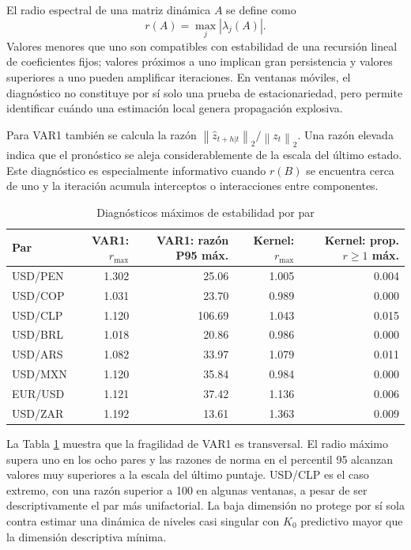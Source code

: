 \documentclass[a4paper,11pt]{article}
\newcommand{\norm}[1]{\left\lVert #1 \right\rVert}
\begin{document}
El radio espectral de una matriz dinámica \(A\) se define como
\[
  r(A)=\max_j|\lambda_j(A)|.
\]
Valores menores que uno son compatibles con estabilidad de una recursión lineal de coeficientes fijos; valores próximos a uno implican gran persistencia y valores superiores a uno pueden amplificar iteraciones. En ventanas móviles, el diagnóstico no constituye por sí solo una prueba de estacionariedad, pero permite identificar cuándo una estimación local genera propagación explosiva.

Para VAR1 también se calcula la razón \(\norm{\widehat z_{t+h|t}}_2/\norm{z_t}_2\). Una razón elevada indica que el pronóstico se aleja considerablemente de la escala del último estado. Este diagnóstico es especialmente informativo cuando \(r(B)\) se encuentra cerca de uno y la iteración acumula interceptos o interacciones entre componentes.

\begin{table}[H]
\centering
\caption{Diagnósticos máximos de estabilidad por par}
\label{tab:stability_pairs}
\scriptsize
\begin{tabular}{lrrrr}
\toprule
Par & VAR1: \(r_{\max}\) & VAR1: razón P95 máx. & Kernel: \(r_{\max}\) & Kernel: prop. \(r\geq1\) máx. \\
\midrule
USD/PEN & 1.302 & 25.06 & 1.005 & 0.004 \\
USD/COP & 1.031 & 23.70 & 0.989 & 0.000 \\
USD/CLP & 1.120 & 106.69 & 1.043 & 0.015 \\
USD/BRL & 1.018 & 20.86 & 0.986 & 0.000 \\
USD/ARS & 1.082 & 33.97 & 1.079 & 0.011 \\
USD/MXN & 1.120 & 35.84 & 0.984 & 0.000 \\
EUR/USD & 1.121 & 37.42 & 1.136 & 0.006 \\
USD/ZAR & 1.192 & 13.61 & 1.363 & 0.009 \\
\bottomrule
\end{tabular}
\end{table}

La Tabla \ref{tab:stability_pairs} muestra que la fragilidad de VAR1 es transversal. El radio máximo supera uno en los ocho pares y las razones de norma en el percentil 95 alcanzan valores muy superiores a la escala del último puntaje. USD/CLP es el caso extremo, con una razón superior a 100 en algunas ventanas, a pesar de ser descriptivamente el par más unifactorial. La baja dimensión no protege por sí sola contra estimar una dinámica de niveles casi singular con \(K_0\) predictivo mayor que la dimensión descriptiva mínima.
\end{document}
